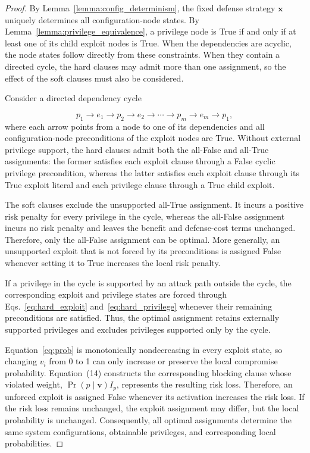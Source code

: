 \documentclass[conference]{IEEEtran}
\theoremstyle{definition} %
\theoremstyle{plain} %
\begin{document}
\begin{proof}
By Lemma~\ref{lemma:config_determinism}, the fixed defense strategy $\mathbf{x}$ uniquely determines all configuration-node states. By Lemma~\ref{lemma:privilege_equivalence}, a privilege node is True if and only if at least one of its child exploit nodes is True. When the dependencies are acyclic, the node states follow directly from these constraints. When they contain a directed cycle, the hard clauses may admit more than one assignment, so the effect of the soft clauses must also be considered.

Consider a directed dependency cycle

$$
p_1\rightarrow e_1\rightarrow p_2\rightarrow e_2\rightarrow\cdots\rightarrow p_m\rightarrow e_m\rightarrow p_1,
$$
where each arrow points from a node to one of its dependencies and all configuration-node preconditions of the exploit nodes are True. Without external privilege support, the hard clauses admit both the all-False and all-True assignments: the former satisfies each exploit clause through a False cyclic privilege precondition, whereas the latter satisfies each exploit clause through its True exploit literal and each privilege clause through a True child exploit.

The soft clauses exclude the unsupported all-True assignment. It incurs a positive risk penalty for every privilege in the cycle, whereas the all-False assignment incurs no risk penalty and leaves the benefit and defense-cost terms unchanged. Therefore, only the all-False assignment can be optimal. More generally, an unsupported exploit that is not forced by its preconditions is assigned False whenever setting it to True increases the local risk penalty.

If a privilege in the cycle is supported by an attack path outside the cycle, the corresponding exploit and privilege states are forced through Eqs.~\eqref{eq:hard_exploit} and~\eqref{eq:hard_privilege} whenever their remaining preconditions are satisfied. Thus, the optimal assignment retains externally supported privileges and excludes privileges supported only by the cycle.

Equation~\eqref{eq:prob} is monotonically nondecreasing in every exploit state, so changing $v_i$ from 0 to 1 can only increase or preserve the local compromise probability. Equation~(14) constructs the corresponding blocking clause whose violated weight, $\Pr(p\mid\mathbf{v})I_p$, represents the resulting risk loss. Therefore, an unforced exploit is assigned False whenever its activation increases the risk loss. If the risk loss remains unchanged, the exploit assignment may differ, but the local probability is unchanged. Consequently, all optimal assignments determine the same system configurations, obtainable privileges, and corresponding local probabilities.
\end{proof}
\end{document}
